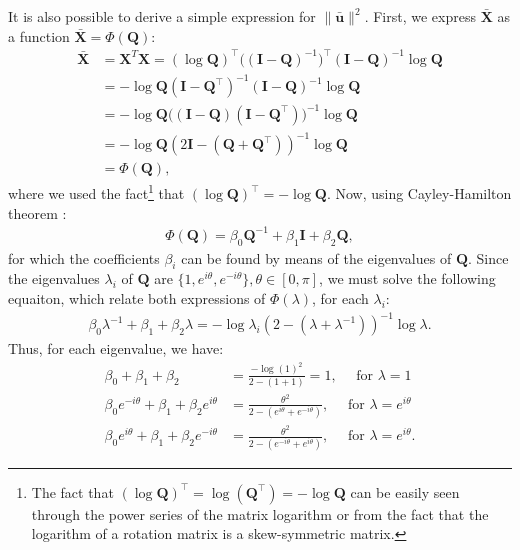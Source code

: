 It is also possible to derive a simple expression for $\|\bar{\mathbf{u}}\|^2$. First, we express $\bar{\mathbf{X}}$ as a function $\bar{\mathbf{X}}=\Phi(\mathbf{Q})$:
\begin{align}
    \bar{\mathbf{X}} &= \mathbf{X}^T\mathbf{X} = (\log\mathbf{Q})^\top\bigl((\mathbf{I} - \mathbf{Q})^{-1}\bigr)^\top(\mathbf{I} - \mathbf{Q})^{-1}\log\mathbf{Q}\\
    &= -\log\mathbf{Q}(\mathbf{I} - \mathbf{Q}^\top)^{-1}(\mathbf{I} - \mathbf{Q})^{-1}\log\mathbf{Q}\\
    &=-\log\mathbf{Q}\bigl((\mathbf{I} - \mathbf{Q})(\mathbf{I} - \mathbf{Q}^\top)\bigr)^{-1}\log\mathbf{Q}\\
    &=-\log\mathbf{Q}(2\mathbf{I}-(\mathbf{Q}+\mathbf{Q}^\top))^{-1}\log\mathbf{Q}\\
    &= \Phi(\mathbf{Q}),
\end{align}
where we used the fact\footnote{The fact that $(\log\mathbf{Q})^\top = \log(\mathbf{Q}^\top) = -\log\mathbf{Q}$ can be easily seen through the power series of the matrix logarithm or from the fact that the logarithm of a rotation matrix is a skew-symmetric matrix.} that $(\log\mathbf{Q})^\top=-\log\mathbf{Q}$. Now, using Cayley-Hamilton theorem \citep[p. 63]{Chen2009}:
\begin{align}
    \Phi(\mathbf{Q}) = \beta_0\mathbf{Q}^{-1} + \beta_1\mathbf{I} + \beta_2\mathbf{Q},
\end{align}
for which the coefficients $\beta_i$ can be found by means of the eigenvalues of $\mathbf{Q}$. Since the eigenvalues $\lambda_i$ of $\mathbf{Q}$ are $\{1, e^{i\theta}, e^{-i\theta}\},\theta\in[0,\pi]$, we must solve the following equaiton, which relate both expressions of $\Phi(\lambda)$, for each $\lambda_i$:
\begin{align}
    \beta_0\lambda^{-1} + \beta_1 + \beta_2\lambda = -\log\lambda_i(2-(\lambda+\lambda^{-1}))^{-1}\log\lambda.
\end{align}
Thus, for each eigenvalue, we have:
\begin{align}
        \beta_0 + \beta_1 + \beta_2 &= \frac{-\log(1)^2}{2 - (1+1)}=1,\quad\text{ for }\lambda = 1 \label{eq:cayley-lambda1}\\
        \beta_0 e^{-i\theta} + \beta_1 + \beta_2 e^{i\theta} &= \frac{\theta^2}{2 - (e^{i\theta}+ e^{-i\theta})},\quad\text{ for }\lambda = e^{i\theta} \label{eq:cayley-lambdaeitheta}\\ 
        \beta_0 e^{i\theta} + \beta_1 + \beta_2 e^{-i\theta} &= \frac{\theta^2}{2 - (e^{-i\theta}+ e^{i\theta})},\quad\text{ for }\lambda = e^{i\theta}. \label{eq:cayley-lambdaMINUSeitheta}
\end{align}
